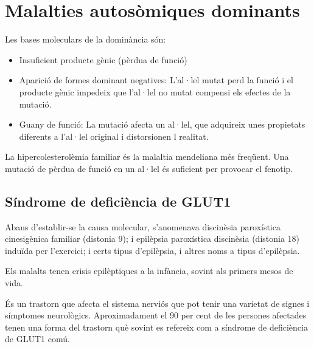 \section{Malalties autosòmiques dominants}

Les bases moleculars de la dominància són:
\begin{itemize}
\item Insuficient producte gènic (pèrdua de funció)

\item Aparició de formes dominant negatives: L'al·lel mutat perd la funció i el producte gènic impedeix que l'al·lel no mutat compensi els efectes de la mutació.

\item Guany de funció: La mutació afecta un al·lel, que adquireix unes propietats diferents a l'al·lel original i distorsionen l realitat.
\end{itemize}

La hipercolesterolèmia familiar és la malaltia mendeliana més freqüent. Una mutació de pèrdua de funció en un al·lel és suficient per provocar el fenotip.

\subsection{Síndrome de deficiència de GLUT1}
Abans d’establir-se la causa molecular, s'anomenava discinèsia paroxística cinesigènica familiar (distonia 9); i epilèpsia paroxística discinèsia (distonia 18) induïda per l'exercici; i certs tipus d'epilèpsia, i altres noms a tipus d’epilèpsia.

Els malalts tenen crisis epilèptiques a la infància, sovint als primers mesos de vida.

És un trastorn que afecta el sistema nerviós que pot tenir una varietat de signes i símptomes neurològics. Aproximadament el 90 per cent de les persones afectades tenen una forma del trastorn què sovint es refereix com a síndrome de deficiència de GLUT1 comú.

